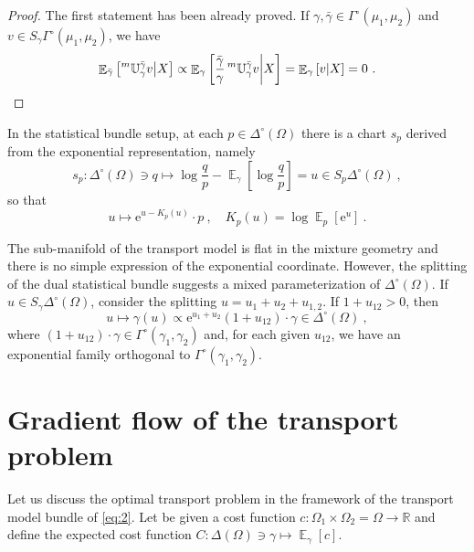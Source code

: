\documentclass[runningheads]{llncs}
\DeclareMathOperator{\Expectation}{\mathbb E}
\newcommand{\condexpectat}[3]{{\Expectation}_{#1}\left[#2 \middle| #3\right]}
\newcommand{\euler}{\mathrm{e}}
\newcommand{\expectat}[2]{{\Expectation}_{#1}\left[#2\right]}
\newcommand{\mtransport}[2]{\prescript{m}{}{\mathbb U}_{#1}^{#2}}
\newcommand{\reals}{\mathbb R}
\begin{document}
\begin{proof}
The first statement has been already proved. If $\gamma,\bar\gamma \in \Gamma^\circ (\mu_1,\mu_2)$ and $v \in S_{\gamma}\Gamma^\circ(\mu_1,\mu_2)$, we have
\begin{equation*}
  \condexpectat {\bar\gamma} {\mtransport {\gamma} {\bar\gamma} v} X \propto \condexpectat {\gamma}{\frac {\bar\gamma}{\gamma} \mtransport {\gamma} {\bar\gamma} v} X = \condexpectat {\gamma} v X = 0 \ . 
\end{equation*}
\end{proof}
\begin{remark}
  In the statistical bundle setup, at each $p \in \Delta^\circ(\Omega)$ there is a chart $s_p$ derived from the exponential representation, namely
\begin{equation*}
 s_p \colon \Delta^\circ(\Omega) \ni q \mapsto \log \frac q p - \expectat \gamma {\log \frac q p} = u \in S_p\Delta^\circ(\Omega) \ ,
\end{equation*}
so that
\begin{equation*}
  u \mapsto \euler^{u - K_p(u)} \cdot p \ , \quad K_p(u) = \log \expectat p {\euler^u} \ .
\end{equation*}

The sub-manifold of the transport model is flat in the mixture geometry and there is no simple expression of the exponential coordinate. However, the splitting of the dual statistical bundle suggests a mixed parameterization of $\Delta^\circ(\Omega)$. If $u \in S_\gamma \Delta^\circ(\Omega)$, consider the splitting $u = u_1+u_2+u_{1,2}$.
If $1 + u_{12} > 0$, then
\begin{equation*}
  u \mapsto \gamma(u) \propto \euler^{u_1+u_2} (1+u_{12})\cdot \gamma \in \Delta^\circ(\Omega)\ ,
\end{equation*}
where $(1+u_{12}) \cdot \gamma \in \Gamma^\circ(\gamma_1,\gamma_2)$ and, for each given $u_{12}$, we have an exponential family orthogonal to $\Gamma^\circ(\gamma_1,\gamma_2)$.
\end{remark}

\section{Gradient flow of the transport problem}
\label{sec:gradientflow}
Let us discuss the optimal transport problem in the framework of the transport model bundle of \cref{eq:2}. Let be given a cost function $c \colon \Omega_1 \times \Omega_2 = \Omega \to \reals$ and define the expected cost function $C \colon \Delta(\Omega)\ni \gamma \mapsto \expectat \gamma c$.
\end{document}
